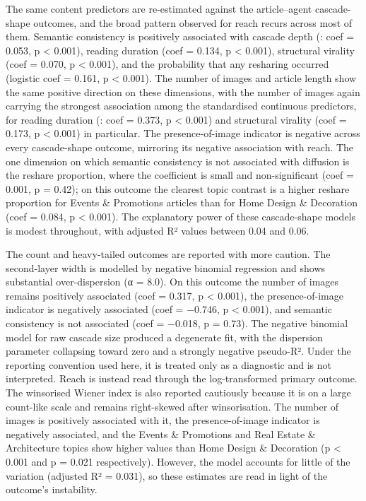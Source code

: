 The same content predictors are re-estimated against the article–agent cascade-shape outcomes, and the broad pattern observed for reach recurs across most of them. Semantic consistency is positively associated with cascade depth (: coef = 0.053, p \textless{} 0.001), reading duration (coef = 0.134, p \textless{} 0.001), structural virality (coef = 0.070, p \textless{} 0.001), and the probability that any resharing occurred (logistic coef = 0.161, p \textless{} 0.001). The number of images and article length show the same positive direction on these dimensions, with the number of images again carrying the strongest association among the standardised continuous predictors, for reading duration (: coef = 0.373, p \textless{} 0.001) and structural virality (coef = 0.173, p \textless{} 0.001) in particular. The presence-of-image indicator is negative across every cascade-shape outcome, mirroring its negative association with reach. The one dimension on which semantic consistency is not associated with diffusion is the reshare proportion, where the  coefficient is small and non-significant (coef = 0.001, p = 0.42); on this outcome the clearest topic contrast is a higher reshare proportion for Events \& Promotions articles than for Home Design \& Decoration (coef = 0.084, p \textless{} 0.001). The explanatory power of these cascade-shape models is modest throughout, with adjusted R² values between 0.04 and 0.06.

The count and heavy-tailed outcomes are reported with more caution. The second-layer width is modelled by negative binomial regression and shows substantial over-dispersion (α = 8.0). On this outcome the number of images remains positively associated (coef = 0.317, p \textless{} 0.001), the presence-of-image indicator is negatively associated (coef = −0.746, p \textless{} 0.001), and semantic consistency is not associated (coef = −0.018, p = 0.73). The negative binomial model for raw cascade size produced a degenerate fit, with the dispersion parameter collapsing toward zero and a strongly negative pseudo-R². Under the reporting convention used here, it is treated only as a diagnostic and is not interpreted. Reach is instead read through the log-transformed primary outcome. The winsorised Wiener index is also reported cautiously because it is on a large count-like scale and remains right-skewed after winsorisation. The number of images is positively associated with it, the presence-of-image indicator is negatively associated, and the Events \& Promotions and Real Estate \& Architecture topics show higher values than Home Design \& Decoration (p \textless{} 0.001 and p = 0.021 respectively). However, the model accounts for little of the variation (adjusted R² = 0.031), so these estimates are read in light of the outcome's instability.

